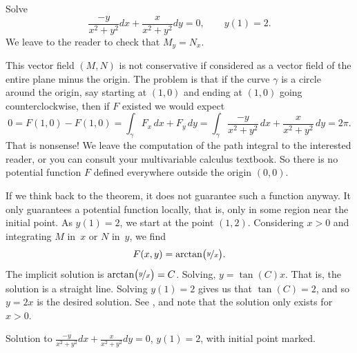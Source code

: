 \begin{example}
Solve
\begin{equation*}
\frac{-y}{x^2+y^2} dx + \frac{x}{x^2+y^2} dy = 0 , \qquad y(1) = 2.
\end{equation*}
We leave to the reader to check that
$M_y = N_x$.

This vector field $(M,N)$ is not conservative if considered as a vector
field of the entire plane minus the origin.  The problem is that if the curve $\gamma$
is a circle around the origin, say starting at $(1,0)$ and
ending at $(1,0)$ going counterclockwise, then if $F$ existed we would expect
\begin{equation*}
0 = F(1,0) - F(1,0) = \int_\gamma F_x \, dx + F_y \, dy = \int_\gamma \frac{-y}{x^2+y^2} \, dx +
\frac{x}{x^2+y^2} \, dy = 2\pi .
\end{equation*}
That is nonsense!
We leave the computation of the path integral to the interested reader, or
you can consult your multivariable calculus textbook.  So there is no
potential function $F$ defined everywhere outside the origin $(0,0)$.

If we think back to the theorem, it does not guarantee such a function
anyway.  It only guarantees a potential function locally, that is, only in
some region near the initial point.  As $y(1) = 2$,
we start at the point $(1,2)$.  Considering $x > 0$ and
integrating $M$ in~$x$ or $N$ in~$y$, we find
\begin{equation*}
F(x,y) = \operatorname{arctan} \bigl( \nicefrac{y}{x} \bigr) .
\end{equation*}
The implicit solution is 
$\operatorname{arctan} \bigl( \nicefrac{y}{x} \bigr) = C$.  Solving,
$y = \tan(C) x$.  That is, the solution is a straight line.  Solving $y(1) =
2$ gives us that $\tan(C) = 2$, and so $y= 2x$ is the desired solution.
See , and note that the solution only exists for $x >
0$.
\begin{myfig}
\capstart
{}
\caption{Solution to 
$\frac{-y}{x^2+y^2} dx + \frac{x}{x^2+y^2} dy = 0$, $y(1) = 2$,
with initial point marked.\label{exact:y2x}}
\end{myfig}
\end{example}

